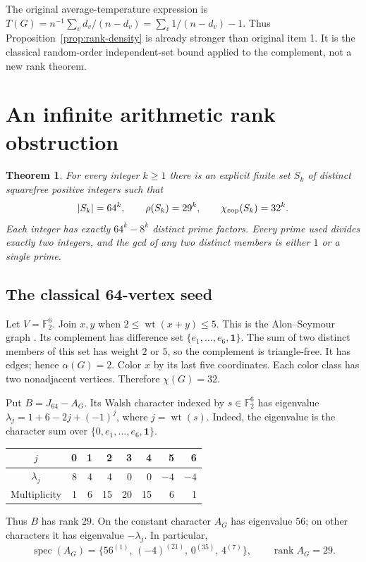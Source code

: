\documentclass[11pt,a4paper]{article}
\newtheorem{theorem}{Theorem}[section]
\theoremstyle{definition}
\theoremstyle{remark}
\DeclareMathOperator{\rank}{rank}
\DeclareMathOperator{\wt}{wt}
\newcommand{\F}{\mathbb F}
\newcommand{\one}{\mathbf 1}
\newcommand{\cchi}{\chi_{\rm cop}}
\numberwithin{equation}{section}
\begin{document}
The original average-temperature expression is
$T(G)=n^{-1}\sum_vd_v/(n-d_v)=\sum_v1/(n-d_v)-1$.
Thus Proposition~\ref{prop:rank-density} is already stronger than
original item 1. It is the classical random-order independent-set bound
applied to the complement, not a new rank theorem.

\section{An infinite arithmetic rank obstruction}

\begin{theorem}\label{thm:arithmetic-family}
For every integer $k\ge1$ there is an explicit finite set $S_k$ of
distinct squarefree positive integers such that
\[
|S_k|=64^k,\qquad \rho(S_k)=29^k,\qquad \cchi(S_k)=32^k.
\]
Each integer has exactly $64^k-8^k$ distinct prime factors.
Every prime used divides exactly two integers, and the gcd of any
two distinct members is either $1$ or a single prime.
\end{theorem}

\subsection{The classical 64-vertex seed}

Let $V=\F_2^6$. Join $x,y$ when $2\le\wt(x+y)\le5$.
This is the Alon--Seymour graph \cite{alonseymour}.
Its complement has difference set
$\{e_1,\ldots,e_6,\one\}$. The sum of two distinct members of this
set has weight $2$ or $5$, so the complement is triangle-free.
It has edges; hence $\alpha(G)=2$.
Color $x$ by its last five coordinates. Each color class has two
nonadjacent vertices. Therefore $\chi(G)=32$.

Put $B=J_{64}-A_G$. Its Walsh character indexed by $s\in\F_2^6$
has eigenvalue
$\lambda_j=1+6-2j+(-1)^j$, where $j=\wt(s)$.
Indeed, the eigenvalue is the character sum over
$\{0,e_1,\ldots,e_6,\one\}$.

\begin{center}
\begin{tabular}{@{}crrrrrrr@{}}
\toprule
$j$ &0&1&2&3&4&5&6\\
\midrule
$\lambda_j$ &8&4&4&0&0&$-4$&$-4$\\
Multiplicity &1&6&15&20&15&6&1\\
\bottomrule
\end{tabular}
\end{center}
Thus $B$ has rank $29$. On the constant character $A_G$ has
eigenvalue $56$; on other characters it has eigenvalue
$-\lambda_j$. In particular,
\[
\operatorname{spec}(A_G)=
\{56^{(1)},\,(-4)^{(21)},\,0^{(35)},\,4^{(7)}\},\qquad \rank A_G=29.
\]
\end{document}
